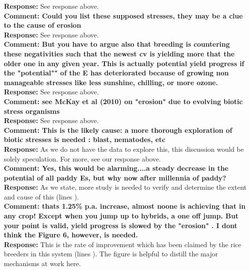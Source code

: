 \documentclass{article} \usepackage[margin=1in]{geometry}
\begin{document}
\textbf{Response: } See response above.\\

\textbf{Comment: Could you list these supposed stresses, they may be a
  clue to the cause of erosion}\\

\textbf{Response: } See response above.\\

\textbf{Comment: But you have to argue also that breeding is
  countering these negativities such that the newest cv is yielding
  more that the older one in any given year. This is actually
  potential yield progress if the "potential"" of the E has
  deteriorated because of growing non manageable stresses like less
  sunshine, chilling, or more ozone.}\\

\textbf{Response: } See response above.\\

\textbf{Comment: see McKay et al (2010) on "erosion" due to evolving
  biotic stress organisms}\\

\textbf{Response: } See response above.\\

\textbf{Comment: This is the likely cause: a more thorough exploration
  of biotic stresses is needed : blast, nematodes, etc}\\

\textbf{Response: } As we do not have the data to explore this, this
discussion would be solely speculation. For more, see our response
above.\\

\textbf{Comment: Yes, this would be alarming....a steady decrease in
  the potential of all paddy Es, but why now after millennia of
  paddy?}\\

\textbf{Response: } As we state, more study is needed to verify and
determine the extent and cause of this (lines ).\\

\textbf{Comment: thats 1.25\% p.a. increase, almost noone is achieving
  that in any crop! Except when you jump up to hybrids, a one off
  jump. But your point is valid, yield progress is slowed by the
  "erosion" . I dont think the Figure 6,  however, is needed.}\\

\textbf{Response: } This is the rate of improvement which has been
claimed by the rice breeders in this system (lines ). The figure is
helpful to distill the major mechanisms at work here.\\
\end{document}
